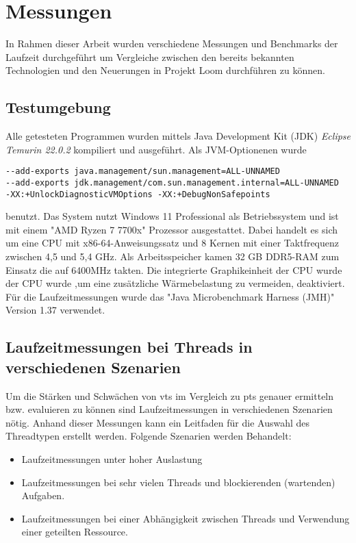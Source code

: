 \chapter{Messungen}
\label{cha:Messungen}
    In Rahmen dieser Arbeit wurden verschiedene Messungen und Benchmarks der Laufzeit durchgeführt um Vergleiche zwischen den bereits bekannten Technologien und den Neuerungen in Projekt Loom 
    durchführen zu können. 

\section{Testumgebung}                                         
\label{sec:Testumgebung}

    Alle getesteten Programmen wurden mittels Java Development Kit (JDK) \emph{Eclipse Temurin 22.0.2} kompiliert und ausgeführt. Als JVM-Optionenen wurde 
\begin{verbatim}
--add-exports java.management/sun.management=ALL-UNNAMED 
--add-exports jdk.management/com.sun.management.internal=ALL-UNNAMED 
-XX:+UnlockDiagnosticVMOptions -XX:+DebugNonSafepoints\end{verbatim}
    benutzt.
    Das System nutzt Windows 11 Professional als Betriebssystem und ist mit einem "AMD Ryzen 7 7700x" Prozessor ausgestattet. Dabei handelt es sich um eine CPU mit x86-64-Anweisungssatz und 8 
    Kernen mit einer Taktfrequenz zwischen 4,5 und 5,4 GHz. Als Arbeitsspeicher kamen  32 GB DDR5-RAM zum Einsatz die auf 6400MHz takten. Die integrierte Graphikeinheit der CPU wurde der CPU wurde 
    ,um eine zusätzliche Wärmebelastung zu vermeiden, deaktiviert. 
    Für die Laufzeitmessungen wurde das "Java Microbenchmark Harness (JMH)" Version 1.37 verwendet. 


\section{Laufzeitmessungen bei Threads in verschiedenen Szenarien}                                         
\label{sec:LaufzeitmessungenbeiThreadsinverschiedenenSzenarien}

    Um die Stärken und Schwächen von \Glspl{vt} im Vergleich zu \Glspl{pt} genauer ermitteln bzw. evaluieren zu können sind Laufzeitmessungen in verschiedenen Szenarien nötig. 
    Anhand dieser Messungen kann ein Leitfaden für die Auswahl des Threadtypen erstellt werden. 
    Folgende Szenarien werden Behandelt:
    \begin{itemize}
        \item Laufzeitmessungen unter hoher Auslastung
        \item Laufzeitmessungen bei sehr vielen Threads und blockierenden (wartenden) Aufgaben.
        \item Laufzeitmessungen bei einer Abhängigkeit zwischen Threads und Verwendung einer geteilten Ressource.
    \end{itemize}


